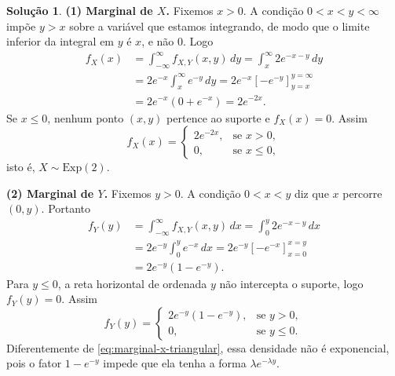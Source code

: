 \documentclass[12pt,portuguese]{article}
\theoremstyle{definition}
\theoremstyle{plainexercise}
\theoremstyle{starredexercise}
\theoremstyle{definition}
\newtheorem*{solution}{Solução}
\begin{document}
\begin{solution}

\noindent\textbf{(1) Marginal de $X$.}
Fixemos $x > 0$. A condição $0 < x < y < \infty$ impõe $y > x$ sobre a variável que estamos
integrando, de modo que o limite inferior da integral em $y$ é $x$, e não $0$. Logo
\begin{align*}
  f_X(x)
  &= \int_{-\infty}^{\infty} f_{X,Y}(x,y)\,dy
   = \int_x^{\infty} 2e^{-x-y}\,dy \\[0.2cm]
  &= 2e^{-x}\int_x^{\infty} e^{-y}\,dy
   = 2e^{-x}\left[-e^{-y}\right]_{y=x}^{y=\infty} \\[0.2cm]
  &= 2e^{-x}\left(0 + e^{-x}\right)
   = 2e^{-2x}.
\end{align*}
Se $x \leqslant 0$, nenhum ponto $(x,y)$ pertence ao suporte e $f_X(x) = 0$. Assim
\begin{equation}\label{eq:marginal-x-triangular}
  f_X(x) = \begin{cases} 2e^{-2x}, & \text{se } x > 0, \\[0.2cm]
    0, & \text{se } x \leqslant 0, \end{cases}
\end{equation}
isto é, $X \sim \mathrm{Exp}(2)$.

\smallskip
\noindent\textbf{(2) Marginal de $Y$.}
Fixemos $y > 0$. A condição $0 < x < y$ diz que $x$ percorre $(0,y)$. Portanto
\begin{align*}
  f_Y(y)
  &= \int_{-\infty}^{\infty} f_{X,Y}(x,y)\,dx
   = \int_0^{y} 2e^{-x-y}\,dx \\[0.2cm]
  &= 2e^{-y}\int_0^{y} e^{-x}\,dx
   = 2e^{-y}\left[-e^{-x}\right]_{x=0}^{x=y} \\[0.2cm]
  &= 2e^{-y}\left(1 - e^{-y}\right).
\end{align*}
Para $y \leqslant 0$, a reta horizontal de ordenada $y$ não intercepta o suporte, logo
$f_Y(y) = 0$. Assim
\begin{equation}\label{eq:marginal-y-triangular}
  f_Y(y) = \begin{cases} 2e^{-y}\left(1 - e^{-y}\right), & \text{se } y > 0,
    \\[0.2cm] 0, & \text{se } y \leqslant 0. \end{cases}
\end{equation}
Diferentemente de \eqref{eq:marginal-x-triangular}, essa densidade não é exponencial,
pois o fator $1-e^{-y}$ impede que ela tenha a forma $\lambda e^{-\lambda y}$.


\end{solution}
\end{document}
